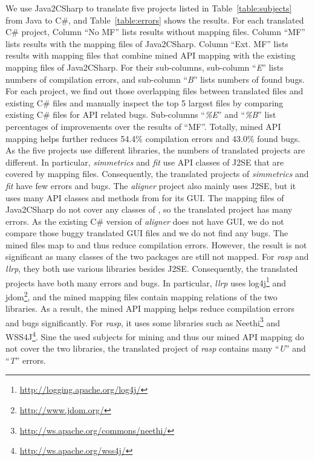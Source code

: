 We use Java2CSharp to translate five projects listed in
Table~\ref{table:subjects} from Java to C\#, and
Table~\ref{table:errors} shows the results. For each translated C\#
project, Column ``No MF'' lists results without mapping files.
Column ``MF'' lists results with the mapping files of Java2CSharp.
Column ``Ext. MF'' lists results with mapping files that combine
mined API mapping with the existing mapping files of Java2CSharp.
For their sub-columns, sub-column ``\emph{E}'' lists numbers of
compilation errors, and sub-column ``\emph{B}'' lists numbers of
found bugs. For each project, we find out those overlapping files
between translated files and existing C\# files and manually inspect
the top 5 largest files by comparing existing C\# files for API
related bugs. Sub-columns ``\emph{\%E}'' and ``\emph{\%B}'' list
percentages of improvements over the results of ``MF''. Totally,
mined API mapping helps further reduces 54.4\% compilation errors
and 43.0\% found bugs. As the five projects use different libraries,
the numbers of translated projects are different. In particular,
\emph{simmetrics} and \emph{fit} use API classes of J2SE that are
covered by mapping files. Consequently, the translated projects of
\emph{simmetrics} and \emph{fit} have few errors and bugs. The
\emph{aligner} project also mainly uses J2SE, but it uses many API
classes and methods from  for its GUI. The mapping
files of Java2CSharp do not cover any classes of ,
so the translated project has many errors. As the existing C\#
version of \emph{aligner} does not have GUI, we do not compare those
buggy translated GUI files and we do not find any bugs. The mined
files map  to  and
thus reduce compilation errors. However, the result is not
significant as many classes of the two packages are still not
mapped. For \emph{rasp} and \emph{llrp}, they both use various
libraries besides J2SE. Consequently, the translated projects have
both many errors and bugs. In particular, \emph{llrp} uses
log4j\footnote{\url{http://logging.apache.org/log4j/}} and
jdom\footnote{\url{http://www.jdom.org/}}, and the mined mapping
files contain mapping relations of the two libraries. As a result,
the mined API mapping helps reduce compilation errors and bugs
significantly. For \emph{rasp}, it uses some libraries such as
Neethi\footnote{\url{http://ws.apache.org/commons/neethi/}} and
WSS4J\footnote{\url{http://ws.apache.org/wss4j/}}. Sine the used
subjects for mining and thus our mined API mapping do not cover the
two libraries, the translated project of \emph{rasp} contains many
``\emph{U}'' and ``\emph{T}'' errors.

